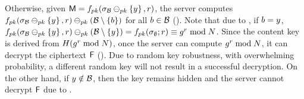 Otherwise, given $\cOutputMeta = \randomizeFn[\pubKey](\genericSig[\blocklist] \sigMinus[\pubKey] 
\setDefn{\genericCInputElmt}, \genericRand)$, the server computes  
$\randomizeFn[\pubKey](\genericSig[\blocklist] 
\sigMinus[\pubKey] 
\setDefn{\genericCInputElmt}, 
\genericRand)\sigMinus[\pubKey] (\blocklist \setminus \setDefn{\genericBlocklistElmt})$ for 
all $\genericBlocklistElmt \in \blocklist$ ().  Note that 
due to , if 
$\genericBlocklistElmt = \genericCInputElmt$, 
$\randomizeFn[\pubKey](\genericSig[\blocklist] 
\sigMinus[\pubKey] 
\setDefn{\genericCInputElmt},
\genericRand)\sigMinus[\pubKey] (\blocklist  \setminus \setDefn{\genericCInputElmt}) = 
\randomizeFn[\pubKey](\genericSig[\emptyset]; \genericRand) \equiv \qrGen^{\genericRand} \bmod 
\rsaMod$. Since the content key is derived from $\ro(\qrGen^{\genericRand} \bmod 
\rsaMod)$, once the server can compute $\qrGen^{\genericRand} \bmod \rsaMod$, it can decrypt 
the ciphertext 
$\cOutputFile$ (). 
Due to random key robustness, with overwhelming probability, a different random  key 
will not result in a successful decryption. On the other hand, if 
$\genericCInputElmt \notin \blocklist$, then the key remains hidden and the server cannot decrypt 
$\cOutputFile$ due to .
\fi 




